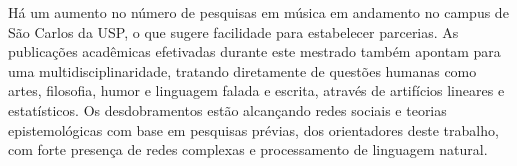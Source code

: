 Há um aumento no número de pesquisas em música em andamento no campus de São Carlos da USP, o que sugere facilidade para estabelecer parcerias.
As publicações acadêmicas efetivadas durante este mestrado também apontam para uma multidisciplinaridade,
tratando diretamente de questões humanas como artes, filosofia, humor e linguagem falada e escrita, através de artifícios lineares e estatísticos.\cite{FabbriSTAT,FabbriACL,FabbriComplenetVoz,FabbriComplenetTexto} Os desdobramentos estão alcançando redes sociais e teorias epistemológicas com base em pesquisas prévias, dos orientadores deste trabalho, com forte presença de redes complexas e processamento de linguagem natural. 
